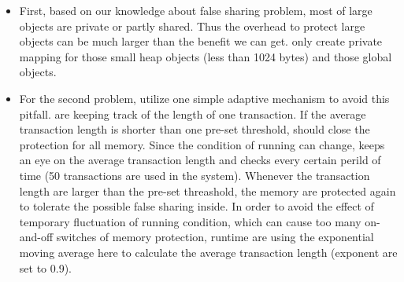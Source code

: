 \begin{itemize}
\item
First, based on our knowledge about false sharing problem, most of large objects are private or partly shared. 
Thus the overhead to protect large objects can be much larger than the benefit we can get.
\sheriffprotect{} only create private mapping for those small heap objects (less than 1024 bytes) and those global objects.

\item 
For the second problem, \sheriffprotect{} utilize one simple adaptive mechanism to avoid this pitfall.
\sheriffprotect{} are keeping track of the length of one transaction.
If the average transaction length is shorter than one pre-set threshold,
\sheriffprotect{} should close the protection for all memory.
Since the condition of running can change, \sheriffprotect{} keeps an eye on the average transaction length 
and checks every certain perild of time (50 transactions are used in the system).
Whenever the transaction length are larger than the pre-set threashold, the memory are protected again to
tolerate the possible false sharing inside.
In order to avoid the effect of temporary fluctuation of running condition,
which can cause too many on-and-off switches of memory protection,
\sheriffprotect{} runtime are using the exponential moving average here
to calculate the average transaction length (exponent are set to 0.9).

\end{itemize}
